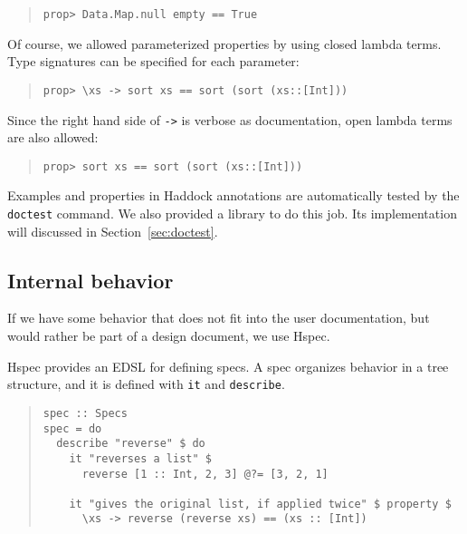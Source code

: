 \documentclass[preprint]{sigplanconf}
\newcommand{\hspec}{Hspec}
\begin{document}
\begin{quote}
\small
\begin{verbatim}
prop> Data.Map.null empty == True
\end{verbatim}
\end{quote}

\noindent Of course, we allowed parameterized properties by
using closed lambda terms.
Type signatures can be specified for each parameter:

\begin{quote}
\small
\begin{verbatim}
prop> \xs -> sort xs == sort (sort (xs::[Int]))
\end{verbatim}
\end{quote}

\noindent Since the right hand side of {\tt ->} is verbose as documentation,
open lambda terms are also allowed:

\begin{quote}
\small
\begin{verbatim}
prop> sort xs == sort (sort (xs::[Int]))
\end{verbatim}
\end{quote}

Examples and properties in Haddock annotations are automatically
tested by the {\tt doctest} command. We also provided a library
to do this job. Its implementation will discussed in Section~\ref{sec:doctest}.

\subsection{Internal behavior}
\label{sec:Internal-behavior}

If we have some behavior that does not fit into the user documentation, but
would rather be part of a design document, we use \hspec{}.

\hspec{} provides an EDSL for defining specs.  A spec organizes behavior in a
tree structure, and it is defined with \texttt{it} and \texttt{describe}.

\begin{quote}
\small
\begin{verbatim}
spec :: Specs
spec = do
  describe "reverse" $ do
    it "reverses a list" $
      reverse [1 :: Int, 2, 3] @?= [3, 2, 1]

    it "gives the original list, if applied twice" $ property $
      \xs -> reverse (reverse xs) == (xs :: [Int])
\end{verbatim}
\end{quote}
\end{document}

